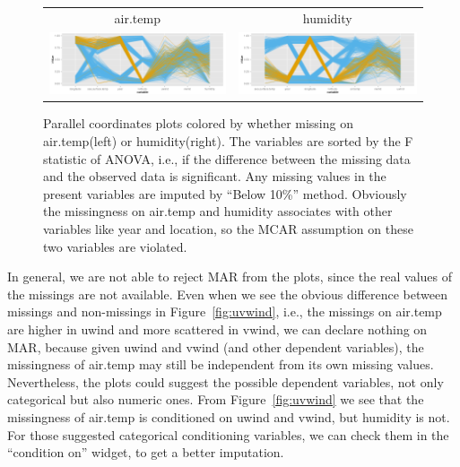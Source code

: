 \documentclass[article]{jss}
\begin{document}
\begin{center}
\begin{figure}[h]
\begin{centering}
\begin{tabular}{cc}
{\tiny{air.temp}} & {\tiny{humidity}}\tabularnewline
\includegraphics[width=.48\textwidth]{graph/fig12-2-air-temp-2} & 
\includegraphics[width=.48\textwidth]{graph/fig12-3-humidity-2} \tabularnewline
\end{tabular}
\par\end{centering}
\caption{Parallel coordinates plots colored by whether missing on air.temp(left) or humidity(right). The variables are sorted by the F statistic of ANOVA, i.e., if the difference between the missing data and the observed data is significant. Any missing values in the present variables are imputed by ``Below 10\%'' method. Obviously the missingness on air.temp and humidity associates with other variables like year and location, so the MCAR assumption on these two variables are violated.}
\label{fig:pcpCheck}
\end{figure}
\par\end{center}

In general, we are not able to reject MAR from the plots, since the real values of the missings are not available. Even when we see the obvious difference between missings and non-missings in Figure~\ref{fig:uvwind}, i.e., the missings on air.temp are higher in uwind and more scattered in vwind, we can declare nothing on MAR, because given uwind and vwind (and other dependent variables), the missingness of air.temp may still be independent from its own missing values. Nevertheless, the plots could suggest the possible dependent variables, not only categorical but also numeric ones. From Figure~\ref{fig:uvwind} we see that the missingness of air.temp is conditioned on uwind and vwind, but humidity is not. For those suggested categorical conditioning variables, we can check them in the ``condition on'' widget, to get a better imputation.
\end{document}

